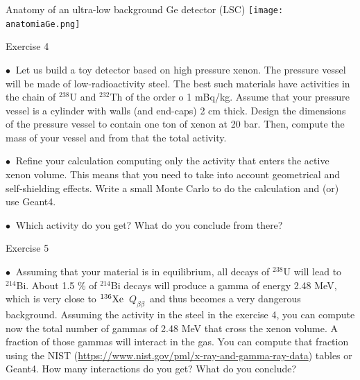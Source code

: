 \documentclass [aspectratio=169]{beamer}
\newcommand{\bbonu}{\ensuremath{\beta\beta0\nu}}
\newcommand{\qbb}{\ensuremath{Q_{\beta\beta}}}
\newcommand{\XE}{\ensuremath{{}^{136}{\rm Xe}}}
\begin{document}
\begin{frame}{Anatomy of an ultra-low background Ge detector (LSC)}
\texttt{[image: anatomiaGe.png]}

%
% 
%
\end{frame}



\begin{frame}{Exercise 4}

$\bullet~$ Let us build a toy detector based on high pressure xenon. The pressure vessel will be made of low-radioactivity steel. The best such materials have activities in the chain of
${}^{238}$U and ${}^{232}$Th of the order o 1 mBq/kg. Assume that your pressure vessel is a cylinder with walls (and end-caps) 2 cm thick. Design the dimensions of the pressure vessel to contain one ton of xenon at 20 bar. Then, compute the mass of your vessel and from that the total activity. 

$\bullet~$ Refine your calculation computing only the activity that enters the active xenon volume. This means that you need to take into account geometrical and self-shielding effects. Write a small Monte Carlo to do the calculation and (or) use Geant4.

$\bullet~$ Which activity do you get? What do you conclude from there?
\end{frame}

\begin{frame}{Exercise 5}

$\bullet~$ Assuming that your material is in equilibrium, all decays of ${}^{238}$U will lead to
${}^{214}$Bi. About 1.5 \% of ${}^{214}$Bi decays will produce a gamma of energy 2.48 MeV, which is very close to \XE\ \qbb\ and thus becomes a very dangerous background. Assuming the activity in the steel in the exercise 4, you can compute now the total number of gammas of 2.48 MeV that cross the xenon volume. A fraction of those gammas will interact in the gas. You can compute that fraction using the NIST (\url{https://www.nist.gov/pml/x-ray-and-gamma-ray-data}) tables or Geant4. How many interactions do you get? What do you conclude?

\end{frame}
\end{document}

